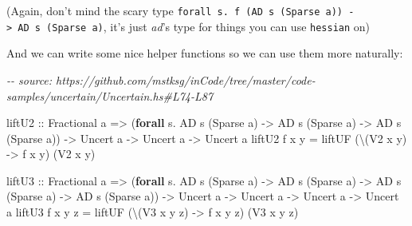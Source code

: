 \documentclass[]{article}
\newenvironment{Shaded}{}{}
\newcommand{\CommentTok}[1]{\textcolor[rgb]{0.38,0.63,0.69}{\textit{#1}}}
\newcommand{\DataTypeTok}[1]{\textcolor[rgb]{0.56,0.13,0.00}{#1}}
\newcommand{\KeywordTok}[1]{\textcolor[rgb]{0.00,0.44,0.13}{\textbf{#1}}}
\newcommand{\NormalTok}[1]{#1}
\newcommand{\OperatorTok}[1]{\textcolor[rgb]{0.40,0.40,0.40}{#1}}
\newcommand{\OtherTok}[1]{\textcolor[rgb]{0.00,0.44,0.13}{#1}}
\begin{document}
(Again, don't mind the scary type
\texttt{forall\ s.\ f\ (AD\ s\ (Sparse\ a))\ -\textgreater{}\ AD\ s\ (Sparse\ a)},
it's just \emph{ad}'s type for things you can use
\texttt{hessian\textquotesingle{}} on)

And we can write some nice helper functions so we can use them more naturally:

\begin{Shaded}
\begin{Highlighting}[]
\CommentTok{{-}{-} source: https://github.com/mstksg/inCode/tree/master/code{-}samples/uncertain/Uncertain.hs\#L74{-}L87}

\OtherTok{liftU2 ::} \DataTypeTok{Fractional}\NormalTok{ a}
       \OtherTok{=>}\NormalTok{ (}\KeywordTok{forall}\NormalTok{ s}\OperatorTok{.} \DataTypeTok{AD}\NormalTok{ s (}\DataTypeTok{Sparse}\NormalTok{ a) }\OtherTok{{-}>} \DataTypeTok{AD}\NormalTok{ s (}\DataTypeTok{Sparse}\NormalTok{ a) }\OtherTok{{-}>} \DataTypeTok{AD}\NormalTok{ s (}\DataTypeTok{Sparse}\NormalTok{ a))}
       \OtherTok{{-}>} \DataTypeTok{Uncert}\NormalTok{ a}
       \OtherTok{{-}>} \DataTypeTok{Uncert}\NormalTok{ a}
       \OtherTok{{-}>} \DataTypeTok{Uncert}\NormalTok{ a}
\NormalTok{liftU2 f x y }\OtherTok{=}\NormalTok{ liftUF (\textbackslash{}(}\DataTypeTok{V2}\NormalTok{ x\textquotesingle{} y\textquotesingle{}) }\OtherTok{{-}>}\NormalTok{ f x\textquotesingle{} y\textquotesingle{}) (}\DataTypeTok{V2}\NormalTok{ x y)}

\OtherTok{liftU3 ::} \DataTypeTok{Fractional}\NormalTok{ a}
       \OtherTok{=>}\NormalTok{ (}\KeywordTok{forall}\NormalTok{ s}\OperatorTok{.} \DataTypeTok{AD}\NormalTok{ s (}\DataTypeTok{Sparse}\NormalTok{ a) }\OtherTok{{-}>} \DataTypeTok{AD}\NormalTok{ s (}\DataTypeTok{Sparse}\NormalTok{ a) }\OtherTok{{-}>} \DataTypeTok{AD}\NormalTok{ s (}\DataTypeTok{Sparse}\NormalTok{ a) }\OtherTok{{-}>} \DataTypeTok{AD}\NormalTok{ s (}\DataTypeTok{Sparse}\NormalTok{ a))}
       \OtherTok{{-}>} \DataTypeTok{Uncert}\NormalTok{ a}
       \OtherTok{{-}>} \DataTypeTok{Uncert}\NormalTok{ a}
       \OtherTok{{-}>} \DataTypeTok{Uncert}\NormalTok{ a}
       \OtherTok{{-}>} \DataTypeTok{Uncert}\NormalTok{ a}
\NormalTok{liftU3 f x y z }\OtherTok{=}\NormalTok{ liftUF (\textbackslash{}(}\DataTypeTok{V3}\NormalTok{ x\textquotesingle{} y\textquotesingle{} z\textquotesingle{}) }\OtherTok{{-}>}\NormalTok{ f x\textquotesingle{} y\textquotesingle{} z\textquotesingle{}) (}\DataTypeTok{V3}\NormalTok{ x y z)}
\end{Highlighting}
\end{Shaded}
\end{document}
